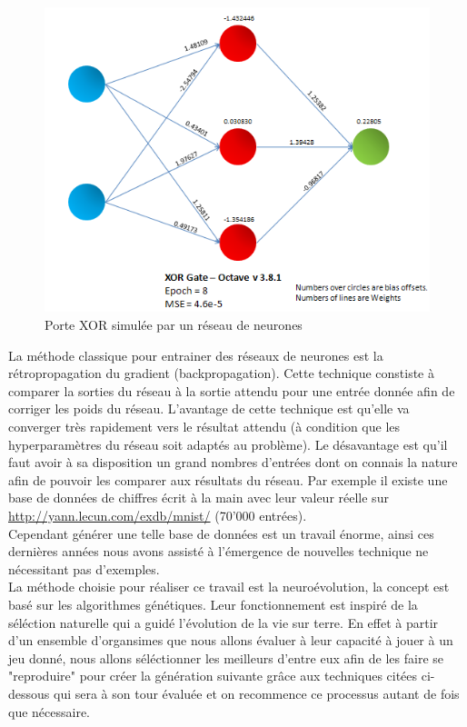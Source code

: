 \documentclass{article}
\begin{document}
\begin{figure}[h]
\begin{center}
	\includegraphics[scale=0.5]{"XOR_Gate.png"} 
	\caption{Porte XOR simulée par un réseau de neurones}
\end{center}
\end{figure}

La méthode classique pour entrainer des réseaux de neurones est la rétropropagation du gradient (backpropagation). Cette technique constiste à comparer la sorties du réseau à la sortie attendu pour une entrée donnée afin de corriger les poids du réseau. L'avantage de cette technique est qu'elle va converger très rapidement vers le résultat attendu (à condition que les hyperparamètres du réseau soit adaptés au problème). Le désavantage est qu'il faut avoir à sa disposition un grand nombres d'entrées dont on connais la nature afin de pouvoir les comparer aux résultats du réseau. Par exemple il existe une base de données de chiffres écrit à la main avec leur valeur réelle sur \url{http://yann.lecun.com/exdb/mnist/} (70'000 entrées).\\

Cependant générer une telle base de données est un travail énorme, ainsi ces dernières années nous avons assisté à l'émergence de nouvelles technique ne nécessitant pas d'exemples.\\

La méthode choisie pour réaliser ce travail est la neuroévolution, la concept est basé sur les algorithmes génétiques. Leur fonctionnement est inspiré de la séléction naturelle qui a guidé l'évolution de la vie sur terre. En effet à partir d'un ensemble d'organsimes que nous allons évaluer à leur capacité à jouer à un jeu donné, nous allons séléctionner les meilleurs d'entre eux afin de les faire se "reproduire" pour créer la génération suivante grâce aux techniques citées ci-dessous qui sera à son tour évaluée et on recommence ce processus autant de fois que nécessaire.\\
\end{document}
